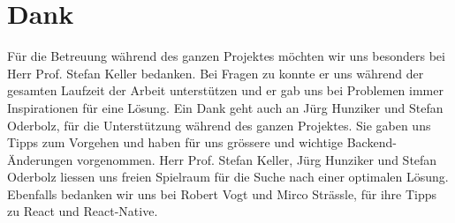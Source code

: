 \chapter*{Dank}
\thispagestyle{scrheadings}

Für die Betreuung während des ganzen Projektes möchten wir uns besonders bei Herr Prof. Stefan
Keller bedanken.
Bei Fragen zu  konnte er uns während der gesamten Laufzeit der Arbeit unterstützen und er gab uns bei Problemen immer Inspirationen für eine Lösung. 
Ein Dank geht auch an Jürg Hunziker und Stefan Oderbolz, für die Unterstützung während des ganzen Projektes.
Sie gaben uns Tipps zum Vorgehen und haben für uns grössere und wichtige Backend-Änderungen vorgenommen. 
Herr Prof. Stefan Keller, Jürg Hunziker und Stefan Oderbolz liessen uns freien Spielraum für die Suche nach einer optimalen Lösung.
Ebenfalls bedanken wir uns bei Robert Vogt und Mirco Strässle, für ihre Tipps zu React und React-Native.